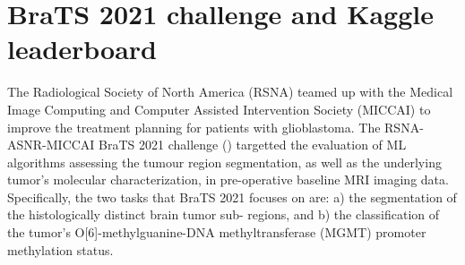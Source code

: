 


\chapter{BraTS 2021 challenge and Kaggle leaderboard}
\ifpdf
    \graphicspath{{Kaggle/Chapter1Figs/PNG/}{Kaggle/Chapter1Figs/PDF/}{Kaggle/Chapter1Figs/}}
\else
    \graphicspath{{Kaggle/Chapter1Figs/EPS/}{Kaggle/Chapter1Figs/}}
\fi









The Radiological Society of North America (RSNA) teamed up with the Medical Image Computing and Computer Assisted Intervention Society (MICCAI) to improve the treatment planning for patients with glioblastoma. The RSNA-ASNR-MICCAI BraTS 2021
challenge (\cite{Brats}) targetted the evaluation of ML algorithms assessing
the tumour region segmentation, as well as the underlying tumor’s molecular characterization, in pre-operative baseline MRI imaging data. Specifically, the two tasks that BraTS 2021 focuses on are: a) the segmentation of the histologically distinct brain tumor sub-
regions, and b) the classification of the tumor’s O[6]-methylguanine-DNA
methyltransferase (MGMT) promoter methylation status. 

